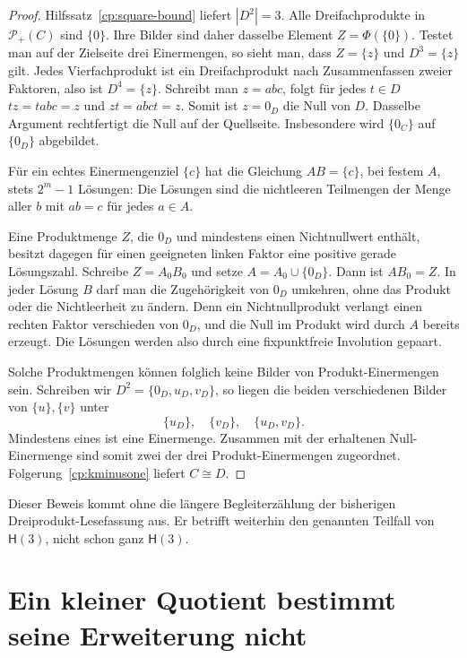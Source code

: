 \documentclass[a4paper,11pt]{article}
\newcommand{\Pp}[1]{\mathcal P_+(#1)}
\begin{document}
\begin{proof}
Hilfssatz~\ref{cp:square-bound} liefert \(|D^2|=3\).
Alle Dreifachprodukte in \(\Pp C\) sind \(\{0\}\). Ihre Bilder
sind daher dasselbe Element \(Z=\Phi(\{0\})\). Testet man auf
der Zielseite drei Einermengen, so sieht man, dass \(Z=\{z\}\)
und \(D^3=\{z\}\) gilt. Jedes Vierfachprodukt ist ein Dreifachprodukt
nach Zusammenfassen zweier Faktoren, also ist \(D^4=\{z\}\).
Schreibt man \(z=abc\), folgt für jedes \(t\in D\)
\(tz=tabc=z\) und \(zt=abct=z\). Somit ist \(z=0_D\) die Null
von \(D\). Dasselbe Argument rechtfertigt die Null auf der Quellseite.
Insbesondere wird \(\{0_C\}\) auf \(\{0_D\}\) abgebildet.

Für ein echtes Einermengenziel \(\{c\}\) hat die Gleichung
\(AB=\{c\}\), bei festem \(A\), stets \(2^m-1\) Lösungen:
Die Lösungen sind die nichtleeren Teilmengen der Menge aller
\(b\) mit \(ab=c\) für jedes \(a\in A\).

Eine Produktmenge \(Z\), die \(0_D\) und mindestens einen
Nichtnullwert enthält, besitzt dagegen für einen geeigneten
linken Faktor eine positive gerade Lösungszahl. Schreibe \(Z=A_0B_0\)
und setze \(A=A_0\cup\{0_D\}\). Dann ist \(AB_0=Z\).
In jeder Lösung \(B\) darf man die Zugehörigkeit von \(0_D\)
umkehren, ohne das Produkt oder die Nichtleerheit zu ändern.
Denn ein Nichtnullprodukt verlangt einen rechten Faktor
verschieden von \(0_D\), und die Null im Produkt wird durch \(A\)
bereits erzeugt. Die Lösungen werden also durch eine fixpunktfreie
Involution gepaart.

Solche Produktmengen können folglich keine Bilder von
Produkt-Einermengen sein. Schreiben wir
\(D^2=\{0_D,u_D,v_D\}\), so liegen die beiden verschiedenen Bilder
von \(\{u\},\{v\}\) unter
\[
 \{u_D\},\quad\{v_D\},\quad\{u_D,v_D\}.
\]
Mindestens eines ist eine Einermenge. Zusammen mit der erhaltenen
Null-Einermenge sind somit zwei der drei Produkt-Einermengen
zugeordnet. Folgerung~\ref{cp:kminusone} liefert \(C\cong D\).
\end{proof}

Dieser Beweis kommt ohne die längere Begleiterzählung der bisherigen
Dreiprodukt-Lesefassung aus. Er betrifft weiterhin den genannten
Teilfall von \(\mathsf H(3)\), nicht schon ganz \(\mathsf H(3)\).

\section{Ein kleiner Quotient bestimmt seine Erweiterung nicht}
\end{document}
